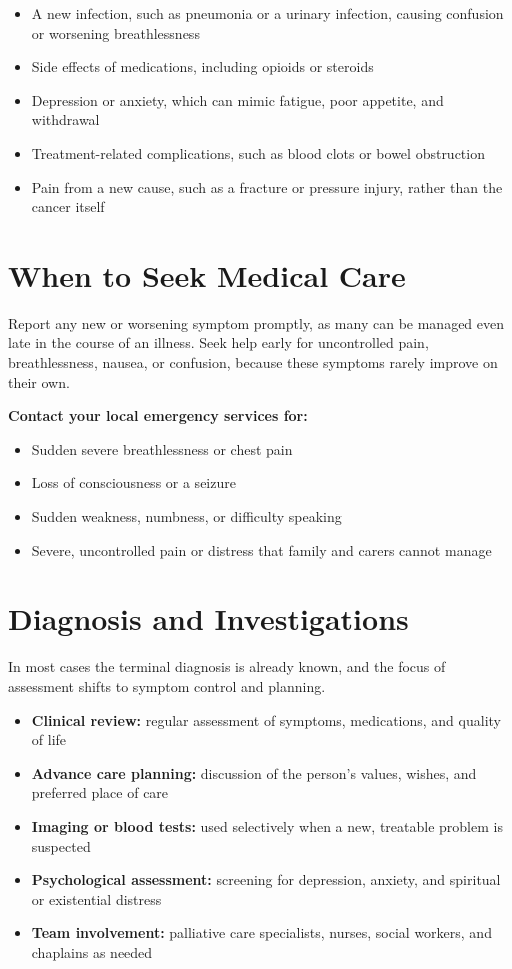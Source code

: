 \begin{itemize}
    \item A new infection, such as pneumonia or a urinary infection, causing confusion or worsening breathlessness
    \item Side effects of medications, including opioids or steroids
    \item Depression or anxiety, which can mimic fatigue, poor appetite, and withdrawal
    \item Treatment-related complications, such as blood clots or bowel obstruction
    \item Pain from a new cause, such as a fracture or pressure injury, rather than the cancer itself
\end{itemize}

\section*{When to Seek Medical Care}
Report any new or worsening symptom promptly, as many can be managed even late in the course of an illness. Seek help early for uncontrolled pain, breathlessness, nausea, or confusion, because these symptoms rarely improve on their own.

\textbf{Contact your local emergency services for:}
\begin{itemize}
    \item Sudden severe breathlessness or chest pain
    \item Loss of consciousness or a seizure
    \item Sudden weakness, numbness, or difficulty speaking
    \item Severe, uncontrolled pain or distress that family and carers cannot manage
\end{itemize}

\section*{Diagnosis and Investigations}
In most cases the terminal diagnosis is already known, and the focus of assessment shifts to symptom control and planning.

\begin{itemize}
    \item \textbf{Clinical review:} regular assessment of symptoms, medications, and quality of life
    \item \textbf{Advance care planning:} discussion of the person's values, wishes, and preferred place of care
    \item \textbf{Imaging or blood tests:} used selectively when a new, treatable problem is suspected
    \item \textbf{Psychological assessment:} screening for depression, anxiety, and spiritual or existential distress
    \item \textbf{Team involvement:} palliative care specialists, nurses, social workers, and chaplains as needed
\end{itemize}

